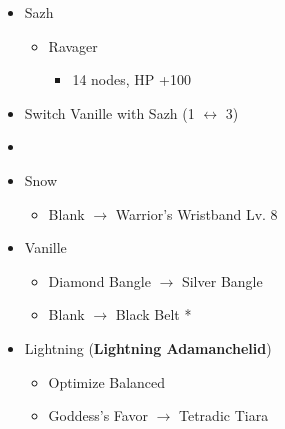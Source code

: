 \begin{multicols}{2}
\begin{menu}
\begin{itemize}
\begin{itemize}
        \item Sazh
        \begin{itemize}
            \item Ravager
            \begin{itemize}
                \item 14 nodes,  HP +100
            \end{itemize}
        \end{itemize}
    \end{itemize}
    \paradigm
    \begin{itemize}
        \item Switch Vanille with Sazh (1 $\leftrightarrow$ 3)
        \item {}%
{\paradigmline{\com}{(\com)}{(\com)}}%
{\paradigmline[2]{\textit{\com}}{\textit{(\com)}}{\textit{(\com)}}}%
{\paradigmline{\syn}{\sen}{(\sab)}}%
{\paradigmline{[\syn]}{\rav}{(\med)}}%
{\paradigmline{\rav}{\rav}{[\med]}}%
{\paradigmline{\rav}{\rav}{[\rav]}}
    \end{itemize}
    \equip
    \begin{itemize}
        \item Snow
        \begin{itemize}
            \item Blank $\rightarrow$ Warrior's Wristband Lv. 8
        \end{itemize}
        \item Vanille
        \begin{itemize}
            \item Diamond Bangle $\rightarrow$ Silver Bangle 
            \item Blank $\rightarrow$ Black Belt * 
        \end{itemize}
        \item Lightning ({\bf Lightning Adamanchelid})
        \begin{itemize}
            \item Optimize Balanced
            \item Goddess's Favor $\rightarrow$ Tetradic Tiara
        \end{itemize}
    \end{itemize}
\end{itemize}
\end{menu}

\renewcommand{\first}{[1] Cerberus (\com/\com/\com)}
\renewcommand{\second}{[2] Cerberus (\com/\com/\com)}
\renewcommand{\third}{[3] Premeditation (\syn/\sen/\sab)}
\renewcommand{\fourth}{[4] Coordination (\syn/\rav/\med)}
\renewcommand{\fifth}{[5] Thaumaturgy (\rav/\rav/\med)}
\renewcommand{\sixth}{[6] Tri-Disaster (\rav/\rav/\rav)}


\end{multicols}
